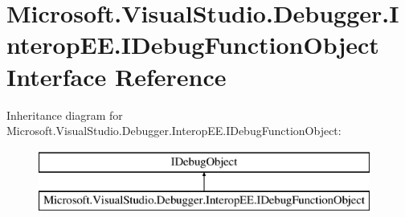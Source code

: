 \hypertarget{interface_microsoft_1_1_visual_studio_1_1_debugger_1_1_interop_e_e_1_1_i_debug_function_object}{\section{Microsoft.\+Visual\+Studio.\+Debugger.\+Interop\+E\+E.\+I\+Debug\+Function\+Object Interface Reference}
\label{interface_microsoft_1_1_visual_studio_1_1_debugger_1_1_interop_e_e_1_1_i_debug_function_object}
}
Inheritance diagram for Microsoft.\+Visual\+Studio.\+Debugger.\+Interop\+E\+E.\+I\+Debug\+Function\+Object\+:\begin{figure}[H]
\begin{center}
\leavevmode
\includegraphics[height=2.000000cm]{interface_microsoft_1_1_visual_studio_1_1_debugger_1_1_interop_e_e_1_1_i_debug_function_object}
\end{center}
\end{figure}
